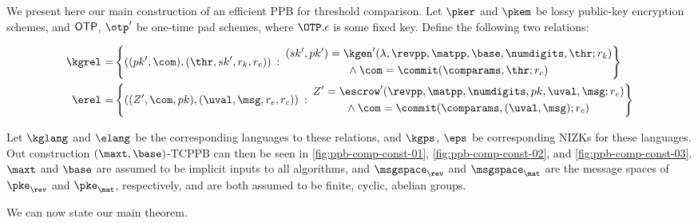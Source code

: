 We present here our main construction of an efficient PPB for threshold comparison.
Let $\pker$ and $\pkem$ be lossy public-key encryption schemes, and ${\sf OTP}$, $\otp'$ be one-time pad schemes, where $\OTP.\epsilon$ is some fixed key.
Define the following two relations:

\begin{align*}
	\kgrel^{} = & \left\{
	((pk', \com), (\thr, sk', r_k, r_c)) \::\:
	\begin{gathered}
		(sk', pk') = \kgen'(\lambda, \revpp, \matpp, \base, \numdigits, \thr; r_k) \\
		\wedge \: \com = \commit(\comparams, \thr; r_c)
	\end{gathered}
	\right\}              \\
	\erel^{} =  & \left\{
	((Z', \com, pk), (\uval, \msg, r_e, r_c)) \::\:
	\begin{gathered}
		Z' = \escrow'(\revpp, \matpp, \numdigits, pk, \uval, \msg; r_e) \\
		\wedge \: \com = \commit(\comparams, (\uval, \msg); r_c)
	\end{gathered}
	\right\}
\end{align*}

Let $\kglang^{}$ and $\elang^{}$ be the corresponding languages to these relations, and
$\kgps^{}$, $\eps^{}$ be corresponding NIZKs for these languages.
Out construction $(\maxt, \base)$-TCPPB can then be seen in \cref{fig:ppb-comp-const-01}, \cref{fig:ppb-comp-const-02}, and \cref{fig:ppb-comp-const-03}.
$\maxt$ and $\base$ are assumed to be implicit inputs to all algorithms, and $\msgspace_\rev$ and $\msgspace_\mat$ are the message spaces of $\pke_\rev$ and $\pke_\mat$, respectively, and are both assumed to be finite, cyclic, abelian groups.





We can now state our main theorem.

%

